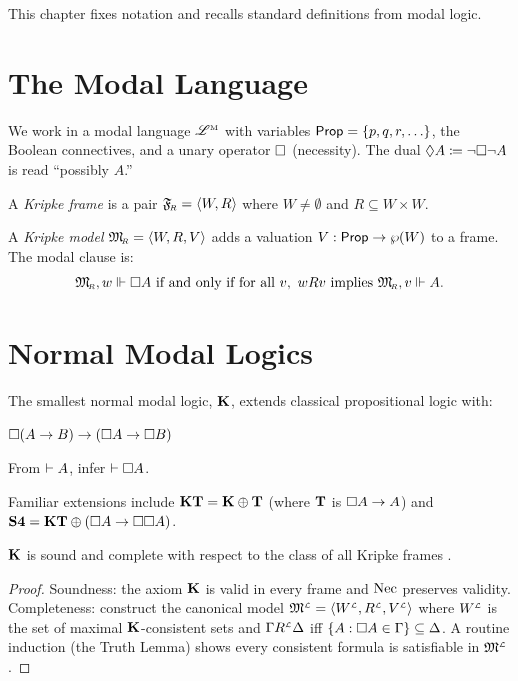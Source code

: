 
This chapter fixes notation and recalls standard definitions from
modal logic.

\section{The Modal Language}

We work in a modal language $\mathscr{L}^{\textnormal{\tiny M}}$ with variables
$\mathsf{Prop} = \{p, q, r, \ldots\}$, the Boolean connectives,
and a unary operator $\Box$ (necessity).  The dual
$\Diamond A \coloneqq \neg\Box\neg A$ is read ``possibly $A$.''

\begin{definition}\label{def:frame}
  A \textit{Kripke frame} is a pair ${\mathfrak{F}_{\!\scriptscriptstyle R}} = \langle W, R \rangle$
  where $W \neq \emptyset$ and $R \subseteq W \times W$.
\end{definition}

\begin{definition}\label{def:model}
  A \textit{Kripke model} ${\mathfrak{M}_{\!\scriptscriptstyle R}} = \langle W, R, V \rangle$
  adds a valuation $V : \mathsf{Prop} \to \wp(W)$ to a frame.
  The modal clause is:
  \[
    {\mathfrak{M}_{\!\scriptscriptstyle R}},w\Vdash \Box A \text{ if and only if }
    \text{for all } v,\ wRv \text{ implies } {\mathfrak{M}_{\!\scriptscriptstyle R}},v\Vdash A.
  \]
\end{definition}

\section{Normal Modal Logics}

The smallest normal modal logic, $\textup{\textbf{K}}$, extends classical
propositional logic with:
\begin{hilbertlist}
  \item[\kax] $\Box(A \to B) \to (\Box A \to \Box B)$
  \item[\nrule] From $\vdash A$, infer $\vdash \Box A$.
\end{hilbertlist}
Familiar extensions include $\textup{\textbf{KT}} = \textup{\textbf{K}} \oplus \textbf{T}$ (where $\textbf{T}$ is
$\Box A \to A$) and $\textup{\textbf{S4}} = \textup{\textbf{KT}} \oplus (\Box A \to \Box\Box A)$.

\begin{theorem}\label{thm:K-completeness}
  $\textup{\textbf{K}}$ is sound and complete with respect to the class of all
  Kripke frames \parencite[see][ch.~4]{blackburn2001}.
\end{theorem}

\begin{proof}
  Soundness: the axiom $\textbf{K}$ is valid in every frame and $\textnormal{Nec}$
  preserves validity.  Completeness: construct the canonical model
  $\mathfrak{M}^{\scriptscriptstyle\mathcal{L}} = \langle W^{\scriptscriptstyle\mathcal{L}}, R^{\scriptscriptstyle\mathcal{L}}, V^{\scriptscriptstyle\mathcal{L}} \rangle$ where
  $W^{\scriptscriptstyle\mathcal{L}}$ is the set of maximal $\textup{\textbf{K}}$-consistent sets and
  $\Gamma R^{\scriptscriptstyle\mathcal{L}} \Delta$ iff $\{A : \Box A \in \Gamma\}
  \subseteq \Delta$.  A routine induction (the Truth Lemma) shows
  every consistent formula is satisfiable in $\mathfrak{M}^{\scriptscriptstyle\mathcal{L}}$.
\end{proof}
